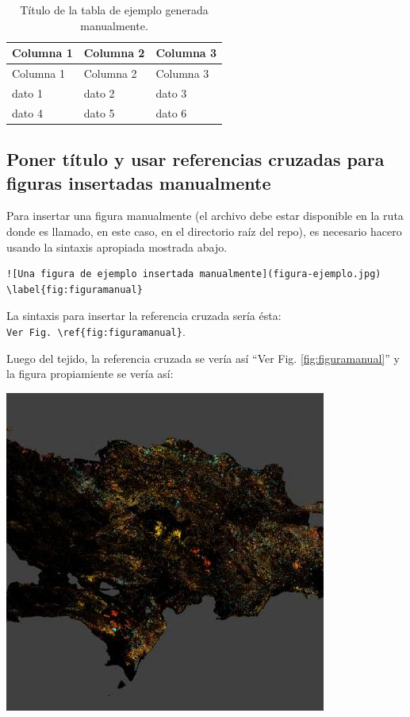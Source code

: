 \documentclass[spanish]{article}
\begin{document}
\begin{longtable}[]{@{}lll@{}}
\caption{Título de la tabla de ejemplo generada
manualmente.\label{tab:tablaejemplomanualmente}}\tabularnewline
\toprule\noalign{}
Columna 1 & Columna 2 & Columna 3 \\
\midrule\noalign{}
\endfirsthead
\toprule\noalign{}
Columna 1 & Columna 2 & Columna 3 \\
\midrule\noalign{}
\endhead
\bottomrule\noalign{}
\endlastfoot
dato 1 & dato 2 & dato 3 \\
dato 4 & dato 5 & dato 6 \\
\end{longtable}

\subsection{Poner título y usar referencias cruzadas para figuras
insertadas
manualmente}\label{poner-tuxedtulo-y-usar-referencias-cruzadas-para-figuras-insertadas-manualmente}

Para insertar una figura manualmente (el archivo debe estar disponible
en la ruta donde es llamado, en este caso, en el directorio raíz del
repo), es necesario hacero usando la sintaxis apropiada mostrada abajo.

\begin{Verbatim}[samepage=true]
![Una figura de ejemplo insertada manualmente](figura-ejemplo.jpg)
\label{fig:figuramanual}
\end{Verbatim}

La sintaxis para insertar la referencia cruzada sería ésta:
\texttt{Ver\ Fig.\ \textbackslash{}ref\{fig:figuramanual\}}.

Luego del tejido, la referencia cruzada se vería así ``Ver Fig.
\ref{fig:figuramanual}'' y la figura propiamiente se vería así:

\includegraphics{figura-ejemplo.jpg} \label{fig:figuramanual}
\end{document}

